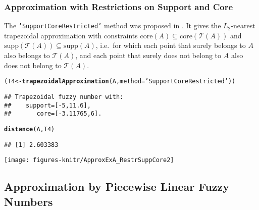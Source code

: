 \documentclass[11pt]{article}\usepackage{graphicx, color}
\makeatletter
\newcommand{\hlfunctioncall}[1]{\textcolor[rgb]{0.501960784313725,0,0.329411764705882}{\textbf{#1}}}%
\newcommand{\hlstring}[1]{\textcolor[rgb]{0.6,0.6,1}{#1}}%
\newenvironment{kframe}{%
 \def\at@end@of@kframe{}%
 \ifinner\ifhmode%
  \def\at@end@of@kframe{\end{minipage}}%
  \begin{minipage}{\columnwidth}%
 \fi\fi%
 \def\FrameCommand##1{\hskip\@totalleftmargin \hskip-\fboxsep
 \colorbox{shadecolor}{##1}\hskip-\fboxsep
     \hskip-\linewidth \hskip-\@totalleftmargin \hskip\columnwidth}%
 \MakeFramed {\advance\hsize-\width
   \@totalleftmargin\z@ \linewidth\hsize
   \@setminipage}}%
 {\par\unskip\endMakeFramed%
 \at@end@of@kframe}
\newenvironment{knitrout}{}{} %
\makeatother
\begin{document}
\subsubsection{Approximation with Restrictions on Support and Core}


The \texttt{'SupportCoreRestricted'} method was proposed in \cite{GrzegorzewskiPasternak2011:trapapproxsupcore}.
It gives the $L_2$-nearest trapezoidal approximation with constraints
$\mathrm{core}(A) \subseteq \mathrm{core}(\mathcal{T}(A))$
and $\mathrm{supp}(\mathcal{T}(A)) \subseteq \mathrm{supp}(A)$,
i.e.~for which each point that surely belongs to $A$ also belongs to $\mathcal{T}(A)$,
and each point that surely does not belong to $A$ also does not belong to $\mathcal{T}(A)$.

\begin{knitrout}\small
{}\color{fgcolor}\begin{kframe}
\begin{alltt}
(T4 <- \hlfunctioncall{trapezoidalApproximation}(A, method=\hlstring{'SupportCoreRestricted'}))
\end{alltt}
\begin{verbatim}
## Trapezoidal fuzzy number with:
##    support=[-5,11.6],
##       core=[-3.11765,6].
\end{verbatim}
\begin{alltt}
\hlfunctioncall{distance}(A, T4)
\end{alltt}
\begin{verbatim}
## [1] 2.603383
\end{verbatim}
\end{kframe}
\end{knitrout}


\begin{center}
\begin{knitrout}\small
{}\color{fgcolor}

{\centering \texttt{[image: figures-knitr/ApproxExA\_RestrSuppCore2]} 

}



\end{knitrout}

\end{center}




\subsection{Approximation by Piecewise Linear Fuzzy Numbers}
\end{document}
